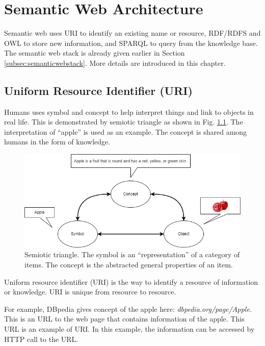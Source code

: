 \chapter{Semantic Web Architecture}

Semantic web uses URI to identify an existing name or resource, RDF/RDFS and OWL to store new information, and SPARQL to query from the knowledge base. The semantic web stack is already given earlier in Section \ref{subsec:semanticwebstack}. More details are introduced in this chapter.

\section{Uniform Resource Identifier (URI)}

Humans uses symbol and concept to help interpret things and link to objects in real life. This is demonstrated by semiotic triangle as shown in Fig. \ref{fig:semiotictriangle}. The interpretation of ``apple'' is used as an example. The concept is shared among humans in the form of knowledge.

\begin{figure}[htbp]
	\centering
	\includegraphics[width=\textwidth]{./chapters/ch-semanticwebarchitecture/figures/semiotic_triangle.png}
	\caption{Semiotic triangle. The symbol is an ``representation'' of a category of items. The concept is the abstracted general properties of an item.}
	\label{fig:semiotictriangle}
\end{figure}

Uniform resource identifier (URI) is the way to identify a resource of information or knowledge. URI is unique from resource to resource.

For example, DBpedia gives concept of the apple here: \textit{dbpedia.org/page/Apple}. This is an URL to the web page that contains information of the apple. This URL is an example of URI. In this example, the information can be accessed by HTTP call to the URL.

